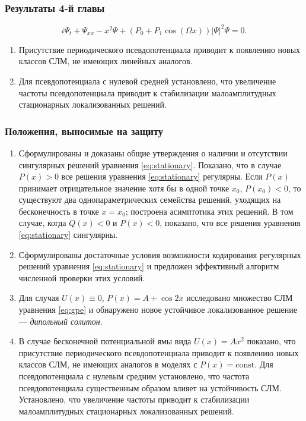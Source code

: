 \documentclass [10pt] {beamer}
\begin{document}
\begin{frame}
	\frametitle{Результаты 4-й главы}
	
	\begin{equation}
		i \Psi_t + \Psi_{xx} - x^2 \Psi + (P_0 + P_1 \cos (\Omega x)) |\Psi|^2 \Psi = 0.
		\label{eq:fourth-chapter-results}
	\end{equation}
	
	\begin{enumerate}
		\item Присутствие периодического псевдопотенциала приводит к появлению новых классов СЛМ, не имеющих линейных аналогов.
		\item Для псевдопотенциала с нулевой средней установлено, что увеличение частоты псевдопотенциала приводит к стабилизации малоамплитудных стационарных локализованных решений.
	\end{enumerate}
\end{frame}

\begin{frame}
	\frametitle{Положения, выносимые на защиту}
	
	{\small
	\begin{enumerate}
		\item Сформулированы и доказаны общие утверждения о наличии и отсутствии сингулярных решений уравнения \eqref{eq:stationary}.
			Показано, что в случае $P(x) > 0$ все решения уравнения \eqref{eq:stationary} регулярны.
			Если $P(x)$ принимает отрицательное значение хотя бы в одной точке $x_0$, $P(x_0) < 0$, то существуют два однопараметрических семейства решений, уходящих на бесконечность в точке $x = x_0$; построена асимптотика этих решений. 
			В том случае, когда $Q(x) < 0$ и $P(x) < 0$, показано, что все решения уравнения \eqref{eq:stationary} сингулярны.
		\item Сформулированы достаточные условия возможности кодирования регулярных решений уравнения \eqref{eq:stationary} и предложен эффективный алгоритм численной проверки этих условий.
		\item Для случая $U(x) \equiv 0$, $P(x) = A + \cos 2x$ исследовано множество СЛМ уравнения \eqref{eq:gpe} и обнаружено новое устойчивое локализованное решение --- {\it дипольный солитон}.
		\item В случае бесконечной потенциальной ямы вида $U(x) = A x^2$ показано, что присутствие периодического псевдопотенциала приводит к появлению новых классов СЛМ, не имеющих аналогов в моделях с $P(x) = \mathrm{const}$.
			Для псевдопотенциала с нулевым средним установлено, что частота псевдопотенциала существенным образом влияет на устойчивость СЛМ.
			Установлено, что увеличение частоты приводит к стабилизации малоамплитудных стационарных локализованных решений.
	\end{enumerate}
	}
\end{frame}
\end{document}
